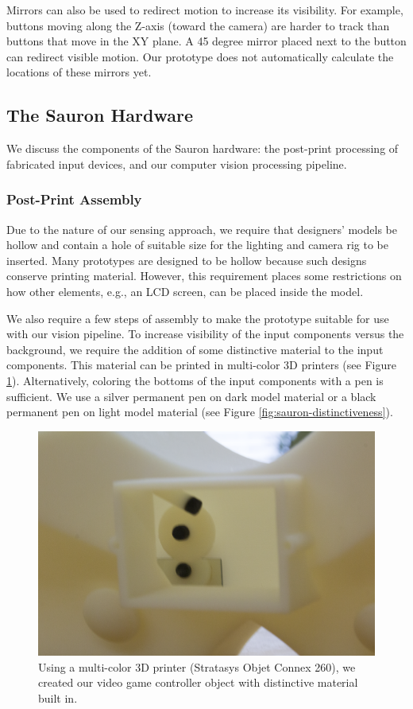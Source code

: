 Mirrors can also be used to redirect motion to increase its visibility. For example, buttons moving along the Z-axis (toward the camera) are harder to track than buttons that move in the XY plane. A 45 degree mirror placed next to the button can redirect visible motion. Our prototype does not automatically calculate the locations of these mirrors yet.

    \subsection{The Sauron Hardware}
    
    We discuss the components of the Sauron hardware: the post-print processing of fabricated input devices, and our computer vision processing pipeline.

\subsubsection{Post-Print Assembly}
Due to the nature of our sensing approach, we require that designers' models be hollow and contain a hole of suitable size for the lighting and camera rig to be inserted. Many prototypes are designed to be hollow because such designs conserve printing material. However, this requirement places some restrictions on how other elements, e.g., an LCD screen, can be placed inside the model. 

We also require a few steps of assembly to make the prototype suitable for use with our vision pipeline.
To increase visibility of the input components versus the background, we require the addition of some distinctive material to the input components. This material can be printed in multi-color 3D printers (see Figure \ref{fig:sauron-objet}). Alternatively, coloring the bottoms of the input components with a pen is sufficient. We use a silver permanent pen on dark model material or a black permanent pen on light model material (see Figure \ref{fig:sauron-distinctiveness}).

\begin{figure}
\centering
\includegraphics[width=\textwidth]{figures/sauron/objetback.png}
\caption{Using a multi-color 3D printer (Stratasys Objet Connex 260), we created our video game controller object with distinctive material built in.
}
\label{fig:sauron-objet}
\end{figure}


